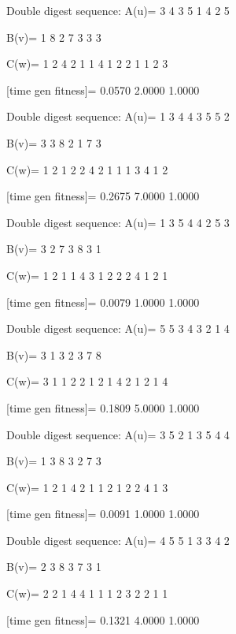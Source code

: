 Double digest sequence:
A(u)=
     3     4     3     5     1     4     2     5

B(v)=
     1     8     2     7     3     3     3

C(w)=
     1     2     4     2     1     1     4     1     2     2     1     1     2     3

[time gen fitness]=
    0.0570    2.0000    1.0000

Double digest sequence:
A(u)=
     1     3     4     4     3     5     5     2

B(v)=
     3     3     8     2     1     7     3

C(w)=
     1     2     1     2     2     4     2     1     1     1     3     4     1     2

[time gen fitness]=
    0.2675    7.0000    1.0000

Double digest sequence:
A(u)=
     1     3     5     4     4     2     5     3

B(v)=
     3     2     7     3     8     3     1

C(w)=
     1     2     1     1     4     3     1     2     2     2     4     1     2     1

[time gen fitness]=
    0.0079    1.0000    1.0000

Double digest sequence:
A(u)=
     5     5     3     4     3     2     1     4

B(v)=
     3     1     3     2     3     7     8

C(w)=
     3     1     1     2     2     1     2     1     4     2     1     2     1     4

[time gen fitness]=
    0.1809    5.0000    1.0000

Double digest sequence:
A(u)=
     3     5     2     1     3     5     4     4

B(v)=
     1     3     8     3     2     7     3

C(w)=
     1     2     1     4     2     1     1     2     1     2     2     4     1     3

[time gen fitness]=
    0.0091    1.0000    1.0000

Double digest sequence:
A(u)=
     4     5     5     1     3     3     4     2

B(v)=
     2     3     8     3     7     3     1

C(w)=
     2     2     1     4     4     1     1     1     2     3     2     2     1     1

[time gen fitness]=
    0.1321    4.0000    1.0000


